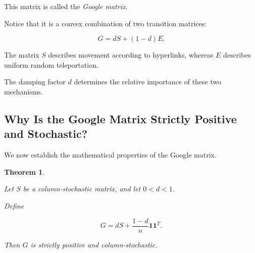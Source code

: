 \documentclass[11pt,a4paper]{article}
\newtheorem{theorem}{Theorem}[section]
\theoremstyle{definition}
\theoremstyle{remark}
\begin{document}
This matrix is called
the \emph{Google matrix}.

Notice that it is
a convex combination
of two transition matrices:

\[
G=dS+(1-d)E.
\]

The matrix $S$
describes movement
according to hyperlinks,
whereas $E$ describes
uniform random teleportation.

The damping factor $d$
determines the relative
importance of these
two mechanisms.


\subsection{Why Is the Google Matrix
Strictly Positive and Stochastic?}

We now establish the
mathematical properties
of the Google matrix.

\begin{theorem}
\label{thm:google_matrix_positive}

Let $S$ be a
column-stochastic matrix,
and let $0<d<1$.

Define

\[
G=
dS+
\frac{1-d}{n}
\mathbf{1}\mathbf{1}^T.
\]

Then $G$ is strictly
positive and
column-stochastic.

\end{theorem}
\end{document}
